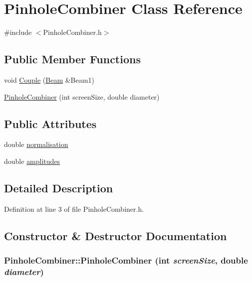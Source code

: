 \hypertarget{classPinholeCombiner}{
\section{PinholeCombiner Class Reference}
\label{classPinholeCombiner}
}


{\ttfamily \#include $<$PinholeCombiner.h$>$}

\subsection*{Public Member Functions}
\begin{DoxyCompactItemize}
\item 
void \hyperlink{classPinholeCombiner_aa231a8296706e8cf7666c0aebec1b19f}{Couple} (\hyperlink{classBeam}{Beam} \&Beam1)
\item 
\hyperlink{classPinholeCombiner_a81f7ec5605b896908c3df4ef02f97537}{PinholeCombiner} (int screenSize, double diameter)
\end{DoxyCompactItemize}
\subsection*{Public Attributes}
\begin{DoxyCompactItemize}
\item 
double \hyperlink{classPinholeCombiner_a1d43795d56c3a248709ff9aaa1097b85}{normalisation}
\item 
double \hyperlink{classPinholeCombiner_acb0d457aae985022003b7fc459763a7f}{amplitudes}
\end{DoxyCompactItemize}


\subsection{Detailed Description}


Definition at line 3 of file PinholeCombiner.h.



\subsection{Constructor \& Destructor Documentation}
\hypertarget{classPinholeCombiner_a81f7ec5605b896908c3df4ef02f97537}{
\subsubsection[{PinholeCombiner}]{\setlength{\rightskip}{0pt plus 5cm}PinholeCombiner::PinholeCombiner (int {\em screenSize}, \/  double {\em diameter})}}
\label{classPinholeCombiner_a81f7ec5605b896908c3df4ef02f97537}


